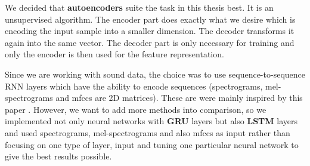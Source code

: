 We decided that \textbf{autoencoders} suite the task in this thesis best. It is an unsupervised algorithm. The encoder part does exactly what we desire which is encoding the input sample into a smaller dimension. The decoder transforms it again into the same vector. The decoder part is only necessary for training and only the encoder is then used for the feature representation.

Since we are working with sound data, the choice was to use sequence-to-sequence RNN layers which have the ability to encode sequences (spectrograms, mel-spectrograms and mfccs are 2D matrices). These are were mainly inspired by this paper \cite{inproceedings_RNNs}. However, we want to add more methods into comparison, so we implemented not only neural networks with \textbf{GRU} layers but also \textbf{LSTM} layers and used spectrograms, mel-spectrograms and also mfccs as input rather than focusing on one type of layer, input and tuning one particular neural network to give the best results possible. 
